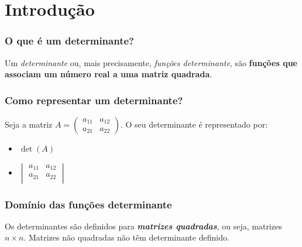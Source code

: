 \documentclass[pdftex, brazil, aspectratio=169]{beamer}
\begin{document}
\section{Introdução}

\begin{frame}[t]
  \frametitle{O que é um determinante?}
  Um \emph{determinante} ou, mais precisamente, \emph{funções determinante}, são
  \textbf{funções que associam um número real a uma matriz quadrada}.
\end{frame}

\begin{frame}[t]
  \frametitle{Como representar um determinante?}
  Seja a matriz $A = \begin{pmatrix}
a_{11} & a_{12}\\
a_{21} & a_{22}\end{pmatrix}$. O seu determinante é representado por:
  \vspace{1cm}
  \begin{itemize}
    \item $\det(A)$
    \vspace{0.5cm}
    \item $\begin{vmatrix}
      a_{11} & a_{12}\\
      a_{21} & a_{22}\\
      \end{vmatrix}$
  \end{itemize}
\end{frame}

\begin{frame}[t]
  \frametitle{Domínio das funções determinante}
  Os determinantes são definidos para \emph{\textbf{matrizes quadradas}}, ou
  seja, matrizes $n \times n$. Matrizes não quadradas não têm determinante
  definido.
\end{frame}
\end{document}
